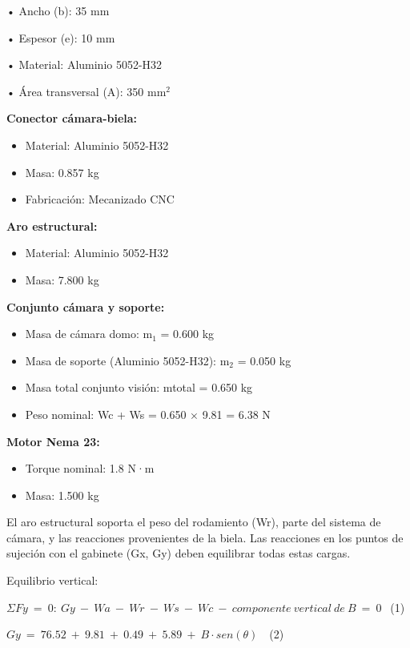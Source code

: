 \documentclass[12pt,a4paper,oneside]{report}
\begin{document}
• Ancho (b): 35 mm

• Espesor (e): 10 mm

• Material: Aluminio 5052-H32

• Área transversal (A): 350 mm\ensuremath{^{2}}

\textbf{Conector cámara-biela:}

\begin{itemize}
\item
  Material: Aluminio 5052-H32
\item
  Masa: 0.857 kg
\item
  Fabricación: Mecanizado CNC
\end{itemize}

\textbf{Aro estructural:}

\begin{itemize}
\item
  Material: Aluminio 5052-H32
\item
  Masa: 7.800 kg
\end{itemize}

\textbf{Conjunto cámara y soporte:}

\begin{itemize}
\item
  Masa de cámara domo: m\ensuremath{_{1}} = 0.600 kg
\item
  Masa de soporte (Aluminio 5052-H32): m\ensuremath{_{2}} = 0.050 kg
\item
  Masa total conjunto visión: mtotal = 0.650 kg
\item
  Peso nominal: Wc + Ws = 0.650 \ensuremath{\times} 9.81 = 6.38 N
\end{itemize}

\textbf{Motor Nema 23:}

\begin{itemize}
\item
  Torque nominal: 1.8 N·m
\item
  Masa: 1.500 kg
\end{itemize}

El aro estructural soporta el peso del rodamiento (Wr), parte del sistema de cámara, y las reacciones provenientes de la biela. Las reacciones en los puntos de sujeción con el gabinete (Gx, Gy) deben equilibrar todas estas cargas.

Equilibrio vertical:

\(\Sigma Fy\  = \ 0:\ Gy\  - \ Wa\  - \ Wr\  - \ Ws\  - \ Wc\  - \ componente\ vertical\ de\ B\  = \ 0\ \ \) (1)

\(Gy\  = \ 76.52\  + \ 9.81\  + \ 0.49\  + \ 5.89\  + \ B \cdot sen(\theta)\ \ \ \) (2)
\end{document}
